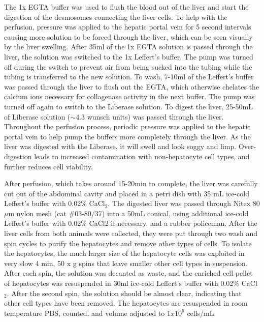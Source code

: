 \documentclass[10pt,letterpaper]{article}
\begin{document}
The 1x EGTA buffer was used to flush the blood out of the liver and
start the digestion of the desmosomes connecting the liver cells. To
help with the perfusion, pressure was applied to the hepatic portal vein
for 5 second intervals causing more solution to be forced through the
liver, which can be seen visually by the liver swelling. After 35ml of
the 1x EGTA solution is passed through the liver, the solution was
switched to the 1x Leffert's buffer. The pump was turned off during the
switch to prevent air from being sucked into the tubing while the tubing
is transferred to the new solution. To wash, 7-10ml of the Leffert's
buffer was passed through the liver to flush out the EGTA, which
otherwise chelates the calcium ions necessary for collagenase activity
in the next buffer. The pump was turned off again to switch to the
Liberase solution. To digest the liver, 25-50mL of Liberase solution
(\(\sim4.3\) wunsch units) was passed through the liver. Throughout the
perfusion process, periodic pressure was applied to the hepatic portal
vein to help pump the buffers more completely through the liver. As the
liver was digested with the Liberase, it will swell and look soggy and
limp. Over-digestion leads to increased contamination with
non-hepatocyte cell types, and further reduces cell viability.

After perfusion, which takes around 15-20min to complete, the liver was
carefully cut out of the abdominal cavity and placed in a petri dish
with 35 mL ice-cold Leffert's buffer with 0.02\% CaCl\(_{2}\). The
digested liver was passed through Nitex 80 \(\mu\)m nylon mesh (cat
\#03-80/37) into a 50mL conical, using additional ice-cold Leffert's
buffer with 0.02\% CaCl2 if necessary, and a rubber policeman. After the
liver cells from both animals were collected, they were put through two
wash and spin cycles to purify the hepatocytes and remove other types of
cells. To isolate the hepatocytes, the much larger size of the
hepatocyte cells was exploited in very slow 4 min, 50 x g spins that
leave smaller other cell types in suspension. After each spin, the
solution was decanted as waste, and the enriched cell pellet of
hepatocytes was resuspended in 30ml ice-cold Leffert's buffer with
0.02\% CaCl\(_{2}\). After the second spin, the solution should be
almost clear, indicating that other cell types have been removed. The
hepatocytes are resuspended in room temperature PBS, counted, and volume
adjusted to \(1 x 10^{6}\) cells/mL.
\end{document}
